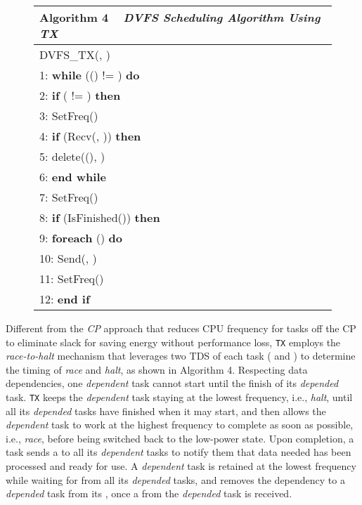 \documentclass[12pt]{elsarticle}
\begin{document}
\begin{figure}\centering
\begin{tabular}{@{}p{\columnwidth}@{}}
\toprule
\textbf{Algorithm 4} ~ \textit{DVFS Scheduling Algorithm Using TX}
\\\midrule
\textsf{DVFS\_TX}\textsf{(}, \textsf{)}\\
\hspace{2.09mm}1: \textbf{while} (\textsf{()} != ) \textbf{do}\\
\hspace{2.09mm}2: \quad \textbf{if} ( != ) \textbf{then}\\
\hspace{2.09mm}3: \quad\quad \textsf{SetFreq()}\\
\hspace{2.09mm}4: \quad \textbf{if} (\textsf{Recv(, )}) \textbf{then}\\
\hspace{2.09mm}5: \quad\quad \textsf{delete((), )}\\
\hspace{2.09mm}6: \textbf{end while}\\
\hspace{2.09mm}7: \textsf{SetFreq()}\\
\hspace{2.09mm}8: \textbf{if} (\textsf{IsFinished()}) \textbf{then}\\
\hspace{2.09mm}9: \quad \textbf{foreach} \textsf{()} \textbf{do}\\
10: \quad\quad \textsf{Send(, )}\\
11: \quad \textsf{SetFreq()}\\
12: \textbf{end if}\\
\midrule
\end{tabular}
\end{figure}


Different from the \emph{CP} approach that reduces CPU frequency for tasks off the CP to eliminate slack for saving energy without performance loss, \texttt{TX} employs the \emph{race-to-halt} mechanism that leverages two TDS of each task ( and ) to determine the timing of \emph{race} and \emph{halt}, as shown in Algorithm 4. Respecting data dependencies, one \emph{dependent} task cannot start until the finish of its \emph{depended} task. \texttt{TX} keeps the \emph{dependent} task staying at the lowest frequency, i.e., \emph{halt}, until all its \emph{depended} tasks have finished when it may start, and then allows the \emph{dependent} task to work at the highest frequency to complete as soon as possible, i.e., \emph{race}, before being switched back to the low-power state. Upon completion, a task sends a  to all its \emph{dependent} tasks to notify them that data needed has been processed and ready for use. A \emph{dependent} task is retained at the lowest frequency while waiting for  from all its \emph{depended} tasks, and removes the dependency to a \emph{depended} task from its , once a  from the \emph{depended} task is received.
\end{document}
